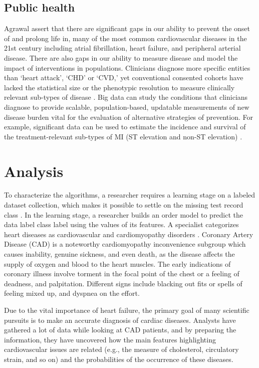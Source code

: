 \documentclass[sigconf]{acmart}
\begin{document}
\subsection{Public health}
Agrawal \cite{agrawal1993mining} assert that there are significant gaps in our ability to prevent the onset of and prolong life in, many of the most common cardiovascular diseases in the 21st century including atrial fibrillation, heart failure, and peripheral arterial disease.
There are also gaps in our ability to measure disease and model the impact of interventions in populations.
Clinicians diagnose more specific entities than `heart attack', `CHD' or `CVD,' yet conventional consented cohorts have lacked the statistical size or the phenotypic resolution to measure clinically relevant sub-types of disease \cite{chu2009bayesian}.
Big data can study the conditions that clinicians diagnose to provide scalable, population-based, updatable measurements of new disease burden vital for the evaluation of alternative strategies of prevention.
For example, significant data can be used to estimate the incidence and survival of the treatment-relevant sub-types of MI (ST elevation and non-ST elevation) \cite{dietterich2000ensemble}.

\section{Analysis}
To characterize the algorithms, a researcher requires a learning stage on a labeled dataset collection, which makes it possible to settle on the missing test record class \cite{ali}.
In the learning stage, a researcher builds an order model to predict the data label class label using the values of its features.
A specialist categorizes heart diseases as cardiovascular and cardiomyopathy disorders \cite{ali}.
Coronary Artery Disease (CAD) is a noteworthy cardiomyopathy inconvenience subgroup which causes inability, genuine sickness, and even death, as the disease affects the supply of  oxygen and blood to the heart muscles.
The early indications of coronary illness involve torment in the focal point of the chest or a feeling of deadness, and palpitation.
Different signs include blacking out fits or spells of feeling mixed up, and dyspnea on the effort.
\par  Due to the vital importance of heart failure, the primary goal of many scientific pursuits is to make an accurate diagnosis of cardiac diseases.
Analysts have gathered a lot of data while looking at CAD patients, and by preparing the information, they have uncovered how the main features highlighting cardiovascular issues are related (e.g., the measure of cholesterol, circulatory strain, and so on) and the probabilities of the occurrence of these diseases.
\end{document}
